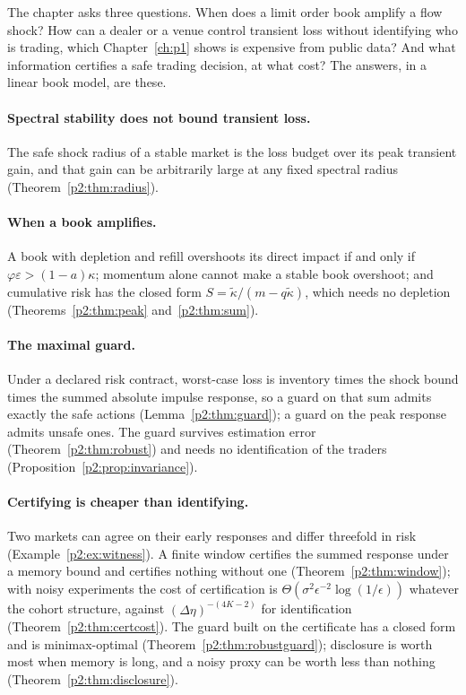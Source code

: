     The chapter asks three questions. When does a limit order book amplify a flow shock? How can a dealer or a venue control transient loss without identifying who is trading, which Chapter~\ref{ch:p1} shows is expensive from public data? And what information certifies a safe trading decision, at what cost? The answers, in a linear book model, are these.

    \paragraph{Spectral stability does not bound transient loss.} The safe shock radius of a stable market is the loss budget over its peak transient gain, and that gain can be arbitrarily large at any fixed spectral radius (Theorem~\ref{p2:thm:radius}).

    \paragraph{When a book amplifies.} A book with depletion and refill overshoots its direct impact if and only if $\varphi\varepsilon>(1-a)\kappa$; momentum alone cannot make a stable book overshoot; and cumulative risk has the closed form $S=\tilde\kappa/(m-q\tilde\kappa)$, which needs no depletion (Theorems~\ref{p2:thm:peak} and~\ref{p2:thm:sum}).

    \paragraph{The maximal guard.} Under a declared risk contract, worst-case loss is inventory times the shock bound times the summed absolute impulse response, so a guard on that sum admits exactly the safe actions (Lemma~\ref{p2:thm:guard}); a guard on the peak response admits unsafe ones. The guard survives estimation error (Theorem~\ref{p2:thm:robust}) and needs no identification of the traders (Proposition~\ref{p2:prop:invariance}).

    \paragraph{Certifying is cheaper than identifying.} Two markets can agree on their early responses and differ threefold in risk (Example~\ref{p2:ex:witness}). A finite window certifies the summed response under a memory bound and certifies nothing without one (Theorem~\ref{p2:thm:window}); with noisy experiments the cost of certification is $\Theta(\sigma^2\epsilon^{-2}\log(1/\epsilon))$ whatever the cohort structure, against $(\Delta\eta)^{-(4K-2)}$ for identification (Theorem~\ref{p2:thm:certcost}). The guard built on the certificate has a closed form and is minimax-optimal (Theorem~\ref{p2:thm:robustguard}); disclosure is worth most when memory is long, and a noisy proxy can be worth less than nothing (Theorem~\ref{p2:thm:disclosure}).

